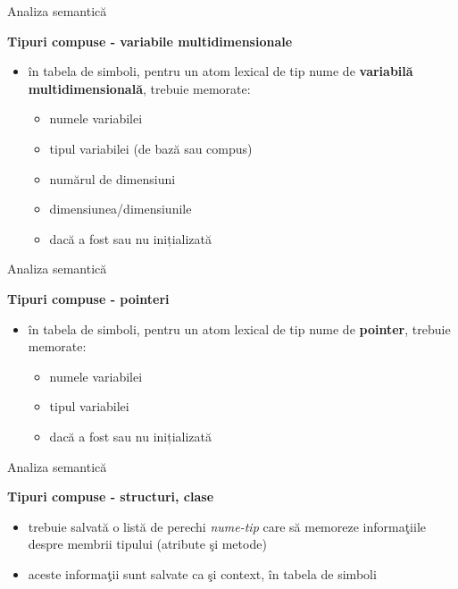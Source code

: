 \documentclass[pdf]{beamer}
\begin{document}
\begin{frame}{Analiza semantică}

\textbf{Tipuri compuse - variabile multidimensionale}

\begin{itemize}
\item
în tabela de simboli, pentru un atom lexical de tip nume de \textbf{variabilă multidimensională}, trebuie memorate:

\begin{itemize}
\item
numele variabilei
\item
tipul variabilei (de bază sau compus)
\item
numărul de dimensiuni
\item
dimensiunea/dimensiunile
\item
dacă a fost sau nu inițializată
\end{itemize}

\end{itemize}
\end{frame}



\begin{frame}{Analiza semantică}

\textbf{Tipuri compuse - pointeri}

\begin{itemize}
\item
în tabela de simboli, pentru un atom lexical de tip nume de \textbf{pointer}, trebuie memorate:

\begin{itemize}
\item
numele variabilei
\item
tipul variabilei
\item
dacă a fost sau nu inițializată
\end{itemize}

\end{itemize}
\end{frame}



\begin{frame}{Analiza semantică}

\textbf{Tipuri compuse - structuri, clase}

\begin{itemize}
\item
trebuie salvată o listă de perechi \textit{nume-tip} care să memoreze informaţiile despre membrii tipului (atribute şi metode)

\item
aceste informaţii sunt salvate ca şi context, în tabela de simboli

\end{itemize}
\end{frame}
\end{document}
